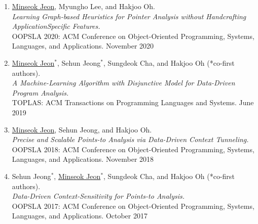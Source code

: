 \documentclass[letterpaper,11pt]{article}
\begin{document}
\begin{enumerate}
{    \textit{A Practical Algorithm for Learning Disjunctive Abstraction Heuristics in Static Program
    Analysis.}\\
    IST: Information and Software Technology. July 2021
  }
  \item{
    \underline{Minseok Jeon}, Myungho Lee, and Hakjoo Oh.\\
    \textit{Learning Graph-based Heuristics for Pointer Analysis without Handcrafting ApplicationSpecific Features.}\\
    OOPSLA 2020: ACM Conference on Object-Oriented Programming, Systems, Languages, and Applications. November 2020
  }
  \item{\underline{Minseok Jeon}$^*$, Sehun Jeong$^*$, Sungdeok Cha, and Hakjoo Oh (*co-first authors).\\
  \textit{A Machine-Learning Algorithm with Disjunctive Model for Data-Driven Program Analysis.}\\
  TOPLAS: ACM Transactions on Programming Languages and Systems. June 2019
  }
  \item{\underline{Minseok Jeon}, Sehun Jeong, and Hakjoo Oh.\\
  \textit{Precise and Scalable Points-to Analysis via Data-Driven Context Tunneling.}\\
  OOPSLA 2018: ACM Conference on Object-Oriented Programming, Systems, Languages, and Applications. November 2018
  }
  \item {Sehun Jeong$^*$, \underline{Minseok Jeon}$^*$, Sungdeok Cha, and Hakjoo Oh  (*co-first
  authors).\\\textit{Data-Driven Context-Sensitivity for Points-to Analysis.}\\
  OOPSLA 2017: ACM Conference on Object-Oriented Programming, Systems, Languages, and Applications. October 2017
  }
\end{enumerate}


  
\end{document}
